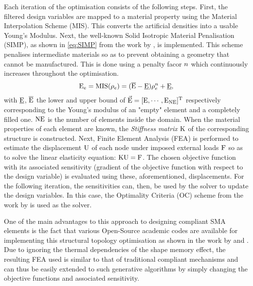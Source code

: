 Each iteration of the optimisation consists of the following steps. First, the filtered design variables are mapped to a material property using the Material Interpolation Scheme (MIS). This converts the artificial densities into a usable Young's Modulus. Next, the well-known Solid Isotropic Material Penalisation (SIMP), as shown in \cref{eq:SIMP} from the work by \cite{bendsoeTopologyOptimizationTheory2013}, is implemented. This scheme penalises intermediate materials so as to prevent obtaining a geometry that cannot be manufactured. This is done using a penalty facor $n$ which continuously increases throughout the optimisation.
\begin{equation} %
  \YoungModulus_\elem = \MIS(\ArtDen_\elem) = ( \overline{\YoungModulus} - \underline{\YoungModulus} ) \ArtDen_\elem ^\PenFac + \underline{\YoungModulus},
\label{eq:SIMP}
\end{equation}
with $\underline{\text{E}}$, $\overline{\text{E}}$ the lower and upper bound of $\vec{\text{E}} =  [\ \!\! \text{E}, \cdots, \text{E}_{\text{NE}}]\ \!\!^\text{T}$ respectively corresponding to the Young's modulus of an "empty" element and a completely filled one. $\text{NE}$ is the number of elements inside the domain.
When the material properties of each element are known, the \textit{Stiffness matrix} $\text{K}$ of the corresponding structure is constructed. Next, Finite Element Analysis (FEA) is performed to estimate the displacement $\text{U}$ of each node under imposed external loads $\text{F}$ so as to solve the linear elasticity equation: $\text{K} \text{U} = \text{F}$. The chosen objective function with its associated sensitivity (gradient of the objective function with respect to the design variable) is evaluated using these, aforementioned, displacements. For the following iteration, the sensitivities can, then, be used by the solver to update the design variables. In this case, the Optimality Criteria (OC) scheme from the work by \cite{bendsoeTopologyOptimizationTheory2013} is used as the solver.

One of the main advantages to this approach to designing compliant SMA elements is the fact that various Open-Source academic codes are available for implementing this structural topology optimisation as shown in the work by \cite{zhuDesignCompliantMechanisms2020} and \cite{talischiPolyTopMatlabImplementation2012}. Due to ignoring the thermal dependencies of the shape memory effect, the resulting FEA used is similar to that of traditional compliant mechanisms and can thus be easily extended to such generative algorithms by simply changing the objective functions and associated sensitivity.

